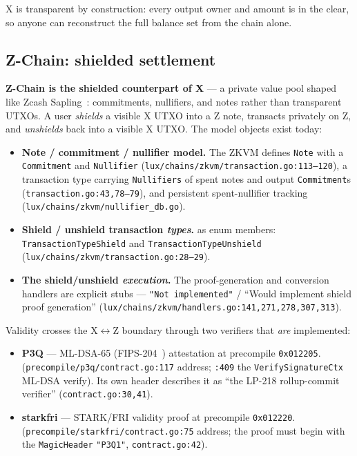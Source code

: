 \noindent X is transparent by construction: every output owner and
amount is in the clear, so anyone can reconstruct the full balance set
from the chain alone.

\subsection{Z-Chain: shielded settlement}

\textbf{Z-Chain is the shielded counterpart of X} --- a private value
pool shaped like Zcash Sapling~\cite{sapling2018}: commitments,
nullifiers, and notes rather than transparent UTXOs. A user
\emph{shields} a visible X UTXO into a Z note, transacts privately on Z,
and \emph{unshields} back into a visible X UTXO. The model objects exist
today:

\begin{itemize}[leftmargin=2em,nosep]
\item \textbf{Note / commitment / nullifier model.} \IMPL{} The ZKVM
  defines \texttt{Note} with a \texttt{Commitment} and \texttt{Nullifier}
  (\texttt{lux/chains/zkvm/transaction.go:113--120}), a transaction type
  carrying \texttt{Nullifiers} of spent notes and output
  \texttt{Commitment}s (\texttt{transaction.go:43,78--79}), and persistent
  spent-nullifier tracking (\texttt{lux/chains/zkvm/nullifier\_db.go}).
\item \textbf{Shield / unshield transaction \emph{types}.} \IMPL{} as
  enum members: \texttt{TransactionTypeShield} and
  \texttt{TransactionTypeUnshield}
  (\texttt{lux/chains/zkvm/transaction.go:28--29}).
\item \textbf{The shield/unshield \emph{execution}.} \DESIGN{} The
  proof-generation and conversion handlers are explicit stubs ---
  \texttt{"Not implemented"} / ``Would implement shield proof
  generation'' (\texttt{lux/chains/zkvm/handlers.go:141,271,278,307,313}).
\end{itemize}

\noindent Validity crosses the X$\leftrightarrow$Z boundary through two
verifiers that \emph{are} implemented:

\begin{itemize}[leftmargin=2em,nosep]
\item \textbf{P3Q} --- ML-DSA-65 (FIPS-204~\cite{fips204}) attestation
  at precompile \texttt{0x012205}. \IMPL{}
  (\texttt{precompile/p3q/contract.go:117} address;
  \texttt{:409} the \texttt{VerifySignatureCtx} ML-DSA verify). Its own
  header describes it as ``the LP-218 rollup-commit verifier''
  (\texttt{contract.go:30,41}).
\item \textbf{starkfri} --- STARK/FRI validity proof at precompile
  \texttt{0x012220}. \IMPL{} (\texttt{precompile/starkfri/contract.go:75}
  address; the proof must begin with the \texttt{MagicHeader}
  \texttt{"P3Q1"}, \texttt{contract.go:42}).
\end{itemize}

